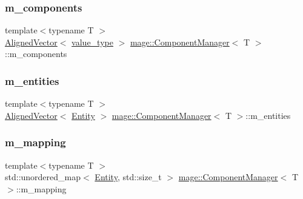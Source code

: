 \subsubsection{\texorpdfstring{m\+\_\+components}{m\_components}}
{\footnotesize\ttfamily template$<$typename T $>$ \\
\mbox{\hyperlink{namespacemage_a8664bfb5ce2179fc64eae9f82c8a5ba8}{Aligned\+Vector}}$<$ \mbox{\hyperlink{classmage_1_1_component_manager_a56aac3b52842bd8955253fa9b528a58d}{value\+\_\+type}} $>$ \mbox{\hyperlink{classmage_1_1_component_manager}{mage\+::\+Component\+Manager}}$<$ T $>$\+::m\+\_\+components\hspace{0.3cm}{\ttfamily [private]}}

\mbox{\label{classmage_1_1_component_manager_a84397106c4d2f50467e978343e1c67db}} 
\subsubsection{\texorpdfstring{m\+\_\+entities}{m\_entities}}
{\footnotesize\ttfamily template$<$typename T $>$ \\
\mbox{\hyperlink{namespacemage_a8664bfb5ce2179fc64eae9f82c8a5ba8}{Aligned\+Vector}}$<$ \mbox{\hyperlink{classmage_1_1_entity}{Entity}} $>$ \mbox{\hyperlink{classmage_1_1_component_manager}{mage\+::\+Component\+Manager}}$<$ T $>$\+::m\+\_\+entities\hspace{0.3cm}{\ttfamily [private]}}

\mbox{\label{classmage_1_1_component_manager_a437e11dc75c6992218687007a7d4ab4a}} 
\subsubsection{\texorpdfstring{m\+\_\+mapping}{m\_mapping}}
{\footnotesize\ttfamily template$<$typename T $>$ \\
std\+::unordered\+\_\+map$<$ \mbox{\hyperlink{classmage_1_1_entity}{Entity}}, std\+::size\+\_\+t $>$ \mbox{\hyperlink{classmage_1_1_component_manager}{mage\+::\+Component\+Manager}}$<$ T $>$\+::m\+\_\+mapping\hspace{0.3cm}{\ttfamily [private]}}

